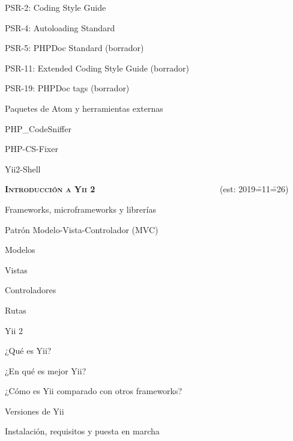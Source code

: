 \begin{longenum}
\begin{longenum}
\begin{longenum}
            \item PSR-2: Coding Style Guide
            \item PSR-4: Autoloading Standard
            \item PSR-5: PHPDoc Standard (borrador)
            \item PSR-11: Extended Coding Style Guide (borrador)
            \item PSR-19: PHPDoc tags (borrador)
        \end{longenum}
        \item Paquetes de Atom y herramientas externas \opcional\
        \begin{longenum}
            \item PHP\_CodeSniffer
            \item PHP-CS-Fixer
            \item Yii2-Shell
        \end{longenum}
    \end{longenum}
    \item \textbf{\textsc{Introducción a Yii 2}} \ \ \ \ \ \ \ \ \ \ \ \ \ \ \ \ \ \ \ \ \ \ \ \ \ \ \ \ \ (est: 2019\==11\==26)
    \begin{longenum}
        \item Frameworks, microframeworks y librerías
        \item Patrón Modelo-Vista-Controlador (MVC)
        \begin{longenum}
            \item Modelos
            \item Vistas
            \item Controladores
            \item Rutas
        \end{longenum}
        \item Yii 2
        \begin{longenum}
            \item ¿Qué es Yii?
            \item ¿En qué es mejor Yii?
            \item ¿Cómo es Yii comparado con otros frameworks?
            \item Versiones de Yii
        \end{longenum}
        \item Instalación, requisitos y puesta en marcha

\end{longenum}
\end{longenum}
